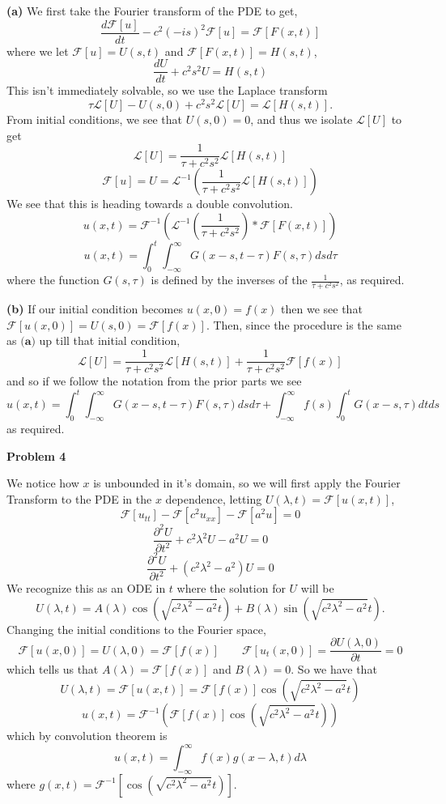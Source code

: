 \documentclass[10pt]{article}
\newcommand{\fo}{\mathcal{F}}
\begin{document}
\textbf{(a)}
We first take the Fourier transform of the PDE to get,
$$\frac{d\mathcal{F}[u]}{dt} - c^{2}(-is)^{2}\mathcal{F}[u] = \mathcal{F}[F(x,t)]$$
where we let $\mathcal{F}[u] = U(s,t)$ and $\mathcal{F}[F(x,t)] = H(s,t)$,
$$\frac{dU}{dt} + c^{2}s^{2}U = H(s,t)$$
This isn't immediately solvable, so we use the Laplace transform
$$\tau\mathcal{L}[U] - U(s,0) + c^{2}s^{2}\mathcal{L}[U] = \mathcal{L}[H(s,t)].$$
From initial conditions, we see that $U(s,0) = 0$, and thus we isolate $\mathcal{L}[U]$ to get
$$\mathcal{L}[U] = \frac{1}{\tau + c^{2}s^{2}}\mathcal{L}[H(s,t)]$$
$$\mathcal{F}[u] = U = \mathcal{L}^{-1}\left(\frac{1}{\tau + c^{2}s^{2}}\mathcal{L}[H(s,t)]\right)$$
We see that this is heading towards a double convolution.
$$u(x,t) = \mathcal{F}^{-1}\left(\mathcal{L}^{-1}\left(\frac{1}{\tau + c^{2}s^{2}}\right)\ast\mathcal{F}[F(x,t)]\right)$$
$$u(x,t) = \int_{0}^{t}\int_{-\infty}^{\infty}G(x-s,t-\tau)F(s,\tau)dsd\tau$$
where the function $G(s,\tau)$ is defined by the inverses of the $\frac{1}{\tau + c^{2}s^{2}}$, as required.

\textbf{(b)}
If our initial condition becomes $u(x,0) = f(x)$ then we see that $\mathcal{F}[u(x,0)] = U(s,0) = \mathcal{F}[f(x)]$. Then, since the procedure is the same as $\textbf{(a)}$ up till that initial condition,
$$\mathcal{L}[U] = \frac{1}{\tau + c^{2}s^{2}}\mathcal{L}[H(s,t)] + \frac{1}{\tau + c^{2}s^{2}}\mathcal{F}[f(x)]$$
and so if we follow the notation from the prior parts we see
$$u(x,t) = \int_{0}^{t}\int_{-\infty}^{\infty}G(x-s,t-\tau)F(s,\tau)dsd\tau + \int_{-\infty}^{\infty}f(s)\int_{0}^{t}G(x-s,\tau)dtds$$
as required.

\newpage
\textbf{Problem 4}

We notice how $x$ is unbounded in it's domain, so we will first apply the Fourier Transform to the PDE in the $x$ dependence, letting $U(\lambda,t) = \fo[u(x,t)]$,
$$\fo[u_{tt}] - \fo[c^{2}u_{xx}] - \fo[a^{2}u] = 0$$
$$\frac{\partial^{2}U}{\partial t^{2}} + c^{2}\lambda^{2}U - a^{2}U = 0$$
$$\frac{\partial^{2}U}{\partial t^{2}} + \left(c^{2}\lambda^{2} - a^{2}\right)U = 0$$
We recognize this as an ODE in $t$ where the solution for $U$ will be
$$U(\lambda,t) = A(\lambda)\cos\left(\sqrt{c^{2}\lambda^{2} - a^{2}}t\right) + B(\lambda)\sin\left(\sqrt{c^{2}\lambda^{2} - a^{2}}t\right).$$
Changing the initial conditions to the Fourier space,
$$\fo[u(x,0)] = U(\lambda,0) = \fo[f(x)] \hspace{2em} \fo[u_{t}(x,0)] = \frac{\partial U(\lambda,0)}{\partial t} = 0$$
which tells us that $A(\lambda) = \fo[f(x)]$ and $B(\lambda) = 0$. So we have that
$$U(\lambda , t) = \fo[u(x,t)] = \fo[f(x)]\cos\left(\sqrt{c^{2}\lambda^{2} - a^{2}}t\right)$$
$$u(x,t) = \fo^{-1}\left(\fo[f(x)]\cos\left(\sqrt{c^{2}\lambda^{2} - a^{2}}t\right)\right)$$
which by convolution theorem is
$$u(x,t) = \int_{-\infty}^{\infty}f(x)g(x-\lambda,t)d\lambda$$
where $g(x,t) = \fo^{-1}[\cos\left(\sqrt{c^{2}\lambda^{2} - a^{2}}t\right)]$.
\end{document}
